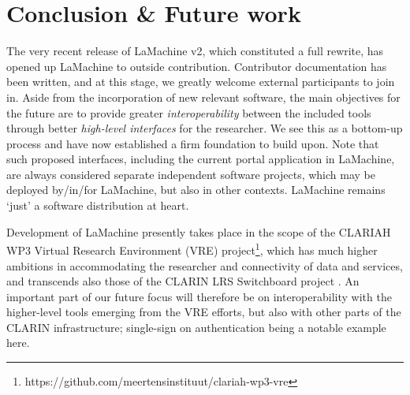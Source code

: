 \documentclass[a4paper,11pt]{article}
\begin{document}
\section{Conclusion \& Future work}

The very recent release of LaMachine v2, which constituted a full rewrite, has opened up LaMachine to outside
contribution. Contributor documentation has been written, and at this stage, we greatly welcome external participants
to join in. Aside from the incorporation of new relevant software, the main objectives for the future are to provide
greater \emph{interoperability} between the included tools through better \emph{high-level interfaces} for the
researcher. We see this as a bottom-up process and have now established a firm foundation to build upon. Note that such
proposed interfaces, including the current portal application in LaMachine, are always considered separate independent
software projects, which may be deployed by/in/for LaMachine, but also in other contexts. LaMachine remains `just'
a software distribution at heart.

Development of LaMachine presently takes place in the scope of the CLARIAH WP3 Virtual Research Environment (VRE)
project\footnote{https://github.com/meertensinstituut/clariah-wp3-vre}, which has much higher ambitions in accommodating
the researcher and connectivity of data and services, and transcends also those of the CLARIN LRS Switchboard project
\cite{switchboard}. An important part of our future focus will therefore be on interoperability with the higher-level
tools emerging from the VRE efforts, but also with other parts of the CLARIN infrastructure; single-sign on
authentication being a notable example here.



\end{document}
